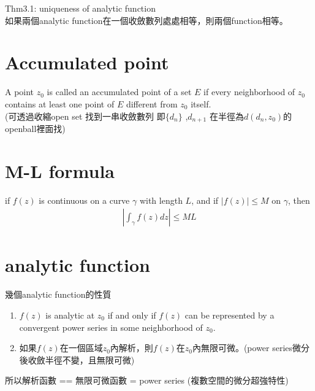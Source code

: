 \documentclass{article}
\begin{document}
Thm3.1: uniqueness of analytic function\\
如果兩個analytic function在一個收斂數列處處相等，則兩個function相等。\\


\section{Accumulated point}
A point $z_0$ is called an accumulated point of a set $E$ if every neighborhood of $z_0$ contains at least one point of $E$ different from $z_0$ itself.\\
(可透過收縮open set 找到一串收斂數列 即$\{d_n\}$ ,$d_{n+1}$ 在半徑為$d(d_{n},z_0)$的openball裡面找)

\section{M-L formula}
if $f(z)$ is continuous on a curve $\gamma$ with length $L$, and if $|f(z)| \leq M$ on $\gamma$, then
\begin{align*}
    |\int_{\gamma} f(z) dz| \leq ML
\end{align*}

\section{analytic function}
幾個analytic function的性質
\begin{enumerate}
    \item $f(z)$ is analytic at $z_0$ if and only if $f(z)$ can be represented by a convergent power series in some neighborhood of $z_0$.
    \item 如果$f(z)$在一個區域$z_0$內解析，則$f(z)$在$z_0$內無限可微。(power series微分後收斂半徑不變，且無限可微)
\end{enumerate}
所以解析函數 == 無限可微函數 = power series (複數空間的微分超強特性)

\section{}

\end{document}
